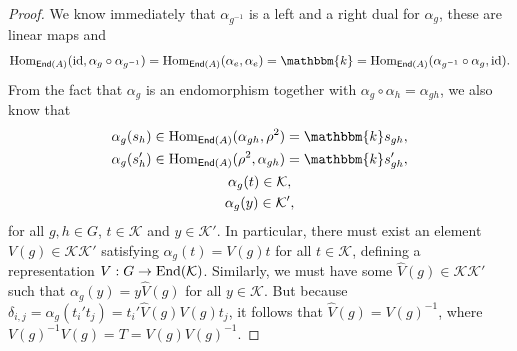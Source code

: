 \noindent\begin{proof} We know immediately that $\alpha_{g^{-1}}$ is a left and a right dual for $\alpha_g$, these are linear maps and
\begin{align*}
\homset_{\textcat{End}(A)}(\id, \alpha_g \circ \alpha_{g^{-1}}) = \homset_{\textcat{End}(A)}(\alpha_e, \alpha_e) = \mathbbm{k} = \homset_{\textcat{End}(A)}(\alpha_{g^{-1}} \circ \alpha_g, \id).
\end{align*}
\noindent From the fact that $\alpha_g$ is an endomorphism together with $\alpha_g \circ \alpha_h = \alpha_{gh}$, we also know that%
\begin{gather*}
\alpha_g(s_h) \in \homset_{\textcat{End}(A)}(\alpha_{gh}, \rho^2) = \mathbbm{k}s_{gh},\\
\alpha_g(s_h') \in \homset_{\textcat{End}(A)}(\rho^2, \alpha_{gh}) = \mathbbm{k}s_{gh}',\\
\alpha_g(t) \in \mathcal{K},\\
\alpha_g(y) \in \mathcal{K}',
\end{gather*}
\noindent for all $g, h \in G$, $t \in \mathcal{K}$ and $y \in \mathcal{K}'$. In particular, there must exist an element $V(g) \in \mathcal{K}\mathcal{K}'$ satisfying $\alpha_g(t) = V(g)t$ for all $t \in \mathcal{K}$, defining a representation $V : G \to \textup{End}(\mathcal{K})$. Similarly, we must have some $\hat{V}(g) \in \mathcal{K}\mathcal{K}'$ such that $\alpha_g(y) = y\hat{V}(g)$ for all $y \in \mathcal{K}$. But because $\delta_{i,j} = \alpha_g(t_i't_j) = t_i'\hat{V}(g)V(g)t_j$, it follows that $\hat{V}(g) = V(g)^{-1}$, where $V(g)^{-1}V(g) = T = V(g)V(g)^{-1}$. %
\end{proof}\\

